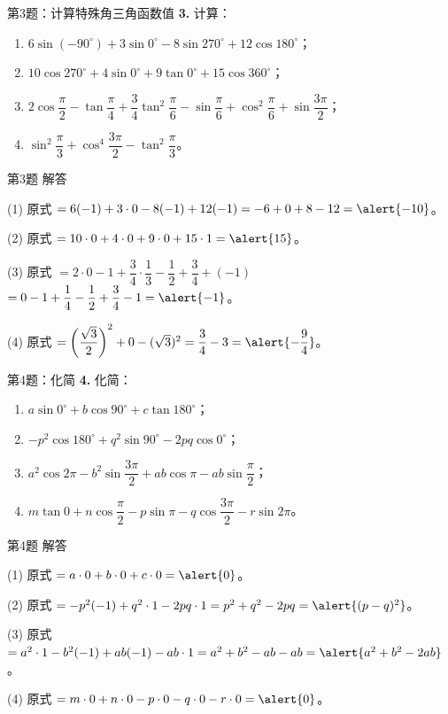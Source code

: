 \documentclass[10pt,aspectratio=169,serif]{beamer}
\begin{document}
\begin{frame}[t]{第3题：计算特殊角三角函数值}
\textbf{3.} 计算：
\begin{enumerate}
  \item $6\sin(-90^\circ)+3\sin 0^\circ-8\sin 270^\circ+12\cos 180^\circ$；
  \item $10\cos 270^\circ+4\sin 0^\circ+9\tan 0^\circ+15\cos 360^\circ$；
  \item $2\cos\dfrac{\pi}{2}-\tan\dfrac{\pi}{4}+\dfrac{3}{4}\tan^2\dfrac{\pi}{6}-\sin\dfrac{\pi}{6}+\cos^2\dfrac{\pi}{6}+\sin\dfrac{3\pi}{2}$；
  \item $\sin^2\dfrac{\pi}{3}+\cos^4\dfrac{3\pi}{2}-\tan^2\dfrac{\pi}{3}$。
\end{enumerate}
\end{frame}

\begin{frame}[t]{第3题 解答}
\begin{tcolorbox}[colback=orange!10,colframe=orange,title=\textbf{解}]
\small
(1) 原式 $=6(-1)+3\cdot 0-8(-1)+12(-1)=-6+0+8-12=\alert{-10}$。

(2) 原式 $=10\cdot 0+4\cdot 0+9\cdot 0+15\cdot 1=\alert{15}$。

(3) 原式 $=2\cdot 0-1+\dfrac{3}{4}\cdot\dfrac{1}{3}-\dfrac{1}{2}+\dfrac{3}{4}+(-1)$
$=0-1+\dfrac{1}{4}-\dfrac{1}{2}+\dfrac{3}{4}-1=\alert{-1}$。

(4) 原式 $=\left(\dfrac{\sqrt{3}}{2}\right)^2+0-(\sqrt{3})^2=\dfrac{3}{4}-3=\alert{-\dfrac{9}{4}}$。
\end{tcolorbox}
\end{frame}

\begin{frame}[t]{第4题：化简}
\textbf{4.} 化简：
\begin{enumerate}
  \item $a\sin 0^\circ+b\cos 90^\circ+c\tan 180^\circ$；
  \item $-p^2\cos 180^\circ+q^2\sin 90^\circ-2pq\cos 0^\circ$；
  \item $a^2\cos 2\pi-b^2\sin\dfrac{3\pi}{2}+ab\cos\pi-ab\sin\dfrac{\pi}{2}$；
  \item $m\tan 0+n\cos\dfrac{\pi}{2}-p\sin\pi-q\cos\dfrac{3\pi}{2}-r\sin 2\pi$。
\end{enumerate}
\end{frame}

\begin{frame}[t]{第4题 解答}
\begin{tcolorbox}[colback=orange!10,colframe=orange,title=\textbf{解}]
\small
(1) 原式 $=a\cdot 0+b\cdot 0+c\cdot 0=\alert{0}$。

(2) 原式 $=-p^2(-1)+q^2\cdot 1-2pq\cdot 1=p^2+q^2-2pq=\alert{(p-q)^2}$。

(3) 原式 $=a^2\cdot 1-b^2(-1)+ab(-1)-ab\cdot 1=a^2+b^2-ab-ab=\alert{a^2+b^2-2ab}$。

(4) 原式 $=m\cdot 0+n\cdot 0-p\cdot 0-q\cdot 0-r\cdot 0=\alert{0}$。
\end{tcolorbox}
\end{frame}
\end{document}
